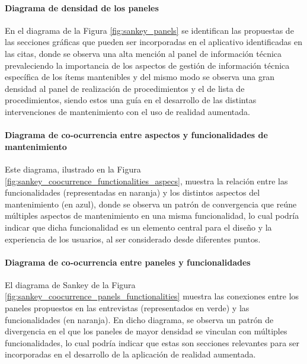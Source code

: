                 

            \paragraph{Diagrama de densidad de los paneles}
            
                En el diagrama de la Figura \ref{fig:sankey_panels} se identifican las propuestas de las secciones gráficas que pueden ser incorporadas en el aplicativo identificadas en las citas, donde se observa una alta mención al panel de información técnica prevaleciendo la importancia de los aspectos de gestión de información técnica específica de los ítems mantenibles y del mismo modo se observa una gran densidad al panel de realización de procedimientos y el de lista de procedimientos, siendo estos una guía en el desarrollo de las distintas intervenciones de mantenimiento con el uso de realidad aumentada.

                
            
            \paragraph{Diagrama de co-ocurrencia entre aspectos y funcionalidades de mantenimiento}
            
                Este diagrama, ilustrado en la Figura \ref{fig:sankey_coocurrence_functionalities_aspecs}, muestra la relación entre las funcionalidades (representadas en naranja) y los distintos aspectos del mantenimiento (en azul), donde se observa un patrón de convergencia que reúne múltiples aspectos de mantenimiento en una misma funcionalidad, lo cual podría indicar que dicha funcionalidad es un elemento central para el diseño y la experiencia de los usuarios, al ser considerado desde diferentes puntos.
            
                

            \paragraph{Diagrama de co-ocurrencia entre paneles y funcionalidades}
            
                El diagrama de Sankey de la Figura \ref{fig:sankey_coocurrence_panels_functionalities} muestra las conexiones entre los paneles propuestos en las entrevistas (representados en verde) y las funcionalidades (en naranja). En dicho diagrama, se observa un patrón de divergencia en el que los paneles de mayor densidad se vinculan con múltiples funcionalidades, lo cual podría indicar que estas son secciones relevantes para ser incorporadas en el desarrollo de la aplicación de realidad aumentada.

